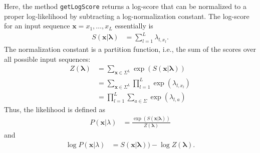 Here, the method \lstinline+getLogScore+ returns a log-score that can be normalized to a proper log-likelihood by subtracting a log-normalization constant.
The log-score for an input sequence $\mathbf{x} = x_1,\ldots,x_L$ essentially is
\begin{align*}
S(\mathbf{x}|\boldsymbol{\lambda}) &= \sum_{l=1}^{L} \lambda_{l,x_l}.
\end{align*}
The normalization constant is a partition function, i.e., the sum of the scores over all possible input sequences:
\begin{align*}
Z(\boldsymbol{\lambda}) &= \sum_{\mathbf{x} \in \Sigma^L} \exp( S(\mathbf{x}|\boldsymbol{\lambda}) )\\
&= \sum_{\mathbf{x} \in \Sigma^L} \prod_{l=1}^{L} \exp(\lambda_{l,x_l})\\
&= \prod_{l=1}^{L} \sum_{a \in \Sigma} \exp(\lambda_{l,a})
\end{align*}
Thus, the likelihood is defined as
\begin{align*}
P(\mathbf{x}|\lambda) &= \frac{\exp(S(\mathbf{x}|\boldsymbol{\lambda}))}{Z(\boldsymbol{\lambda})}
\end{align*}
and
\begin{align*}
\log P(\mathbf{x}|\lambda) &= S(\mathbf{x}|\boldsymbol{\lambda})) - \log Z(\boldsymbol{\lambda}).
\end{align*}
\renewcommand{\codefile}{recipes/PositionWeightMatrixDiffSM.java}
\setcounter{off}{34}

